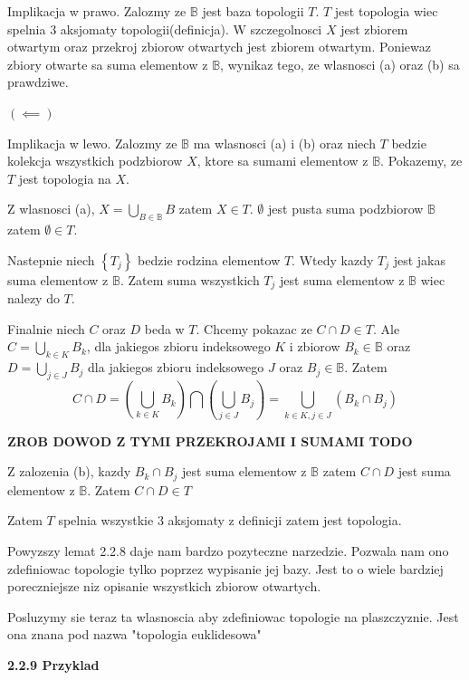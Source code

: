 \documentclass{article}
\begin{document}
Implikacja w prawo. Zalozmy ze $\mathbb{B}$ jest baza topologii $T$. $T$ jest topologia wiec spelnia 3 aksjomaty topologii(definicja). W szczegolnosci $X$ jest zbiorem otwartym oraz przekroj zbiorow otwartych jest zbiorem otwartym. Poniewaz zbiory otwarte sa suma elementow z $\mathbb{B}$, wynikaz tego, ze wlasnosci (a) oraz (b) sa prawdziwe.

$(\impliedby)$

Implikacja w lewo. Zalozmy ze $\mathbb{B}$ ma wlasnosci (a) i (b) oraz niech $T$ bedzie kolekcja wszystkich podzbiorow $X$, ktore sa sumami elementow z $\mathbb{B}$. Pokazemy, ze $T$ jest topologia na $X$.

Z wlasnosci (a), $X = \bigcup\limits_{B \in \mathbb{B}}B$ zatem  $X \in T$. $\emptyset$ jest pusta suma podzbiorow $\mathbb{B}$ zatem $\emptyset \in T$.

Nastepnie niech $\left\{ T_{j} \right\}$ bedzie rodzina elementow $T$. Wtedy kazdy $T_{j}$ jest jakas suma elementow z $\mathbb{B}$. Zatem suma wszystkich $T_{j}$ jest suma elementow z $\mathbb{B}$ wiec nalezy do $T$.

Finalnie niech $C$ oraz $D$ beda w $T$. Chcemy pokazac ze $C \cap D \in T$. Ale $C = \bigcup\limits_{k \in K}B_{k}$, dla jakiegos zbioru indeksowego $K$ i zbiorow $B_{k} \in \mathbb{B}$ oraz $D = \bigcup\limits_{j \in J}B_{j}$ dla jakiegos zbioru indeksowego $J$ oraz $B_{j} \in \mathbb{B}$. Zatem $$ C \cap D = \left(\bigcup\limits_{k \in K}B_{k}\right) \bigcap \left( \bigcup\limits_{j \in J}B_{j} \right) = \bigcup\limits_{k \in K, j \in J}(B_{k} \cap B_{j})$$

\textbf{ZROB DOWOD Z TYMI PRZEKROJAMI I SUMAMI TODO}

Z zalozenia (b), kazdy $B_{k} \cap B_{j}$ jest suma elementow z $\mathbb{B}$ zatem $C \cap D$ jest suma elementow z $\mathbb{B}$. Zatem $C \cap D \in T$ 

Zatem $T$ spelnia wszystkie 3 aksjomaty z definicji zatem jest topologia.

\vspace{1cm}

Powyzszy lemat 2.2.8 daje nam bardzo pozyteczne narzedzie. Pozwala nam ono zdefiniowac topologie tylko poprzez wypisanie jej bazy. Jest to o wiele bardziej poreczniejsze niz opisanie wszystkich zbiorow otwartych.

Posluzymy sie teraz ta wlasnoscia aby zdefiniowac topologie na plaszczyznie. Jest ona znana pod nazwa "topologia euklidesowa"

\textbf{2.2.9 Przyklad}
\end{document}
